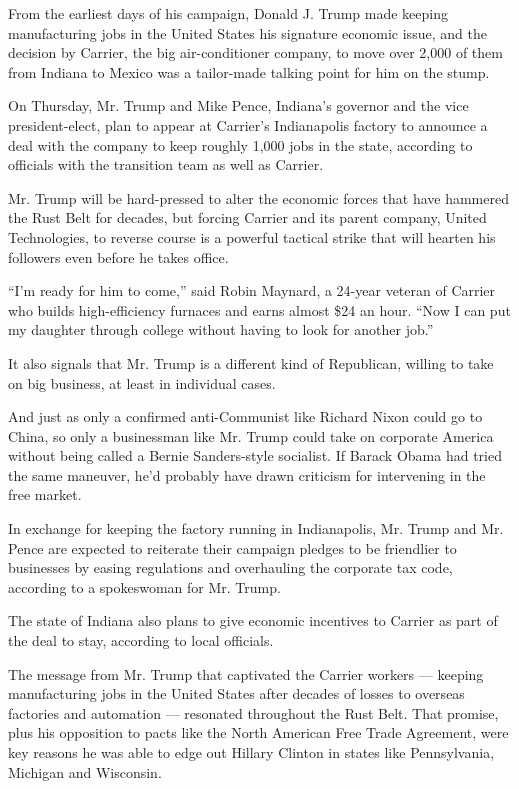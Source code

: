 From the earliest days of his campaign, Donald J. Trump made keeping
manufacturing jobs in the United States his signature economic issue,
and the decision by Carrier, the big air-conditioner company, to move
over 2,000 of them from Indiana to Mexico was a tailor-made talking
point for him on the stump.

On Thursday, Mr. Trump and Mike Pence, Indiana's governor and the vice
president-elect, plan to appear at Carrier's Indianapolis factory to
announce a deal with the company to keep roughly 1,000 jobs in the
state, according to officials with the transition team as well as
Carrier.

Mr. Trump will be hard-pressed to alter the economic forces that have
hammered the Rust Belt for decades, but forcing Carrier and its parent
company, United Technologies, to reverse course is a powerful tactical
strike that will hearten his followers even before he takes office.

``I'm ready for him to come,'' said Robin Maynard, a 24-year veteran of
Carrier who builds high-efficiency furnaces and earns almost \$24 an
hour. ``Now I can put my daughter through college without having to look
for another job.''

It also signals that Mr. Trump is a different kind of Republican,
willing to take on big business, at least in individual cases.

And just as only a confirmed anti-Communist like Richard Nixon could go
to China, so only a businessman like Mr. Trump could take on corporate
America without being called a Bernie Sanders-style socialist. If Barack
Obama had tried the same maneuver, he'd probably have drawn criticism
for intervening in the free market.

In exchange for keeping the factory running in Indianapolis, Mr. Trump
and Mr. Pence are expected to reiterate their campaign pledges to be
friendlier to businesses by easing regulations and overhauling the
corporate tax code, according to a spokeswoman for Mr. Trump.

The state of Indiana also plans to give economic incentives to Carrier
as part of the deal to stay, according to local officials.

The message from Mr. Trump that captivated the Carrier workers ---
keeping manufacturing jobs in the United States after decades of losses
to overseas factories and automation --- resonated throughout the Rust
Belt. That promise, plus his opposition to pacts like the North American
Free Trade Agreement, were key reasons he was able to edge out Hillary
Clinton in states like Pennsylvania, Michigan and Wisconsin.


